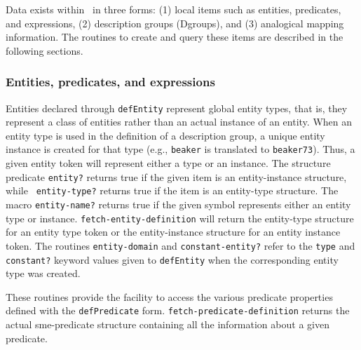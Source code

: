 Data exists within \SME\ in three forms: (1) local items such as entities,
predicates, and expressions, (2) description groups (Dgroups), and (3) analogical
mapping information. The routines to create and query these items are
described in the following sections.

\subsubsection{Entities, predicates, and expressions}

\indent
{}

Entities declared through {\tt defEntity} represent global entity types,
that is, they represent a class of entities rather than an actual instance
of an entity. When an entity type is used in the definition of a description
group, a unique entity instance is created for that type (e.g., {\tt beaker}
is translated to {\tt beaker73}). Thus, a given entity token will represent
either a type or an instance. The structure predicate {\tt entity?} returns
true if the given item is an entity-instance structure, while {\tt
entity-type?} returns true if the item is an entity-type structure. The
macro {\tt entity-name?} returns true if the given symbol represents either
an entity type or instance. {\tt fetch-entity-definition} will return the
entity-type structure for an entity type token or the entity-instance
structure for an entity instance token. The routines {\tt entity-domain} and
{\tt constant-entity?} refer to the {\tt type} and {\tt constant?} keyword
values given to {\tt defEntity} when the corresponding entity type was
created.


These routines provide the facility to access the various predicate properties
defined with the {\tt defPredicate} form. {\tt fetch-predicate-definition}
returns the actual sme-predicate structure containing all the information
about a given predicate.

